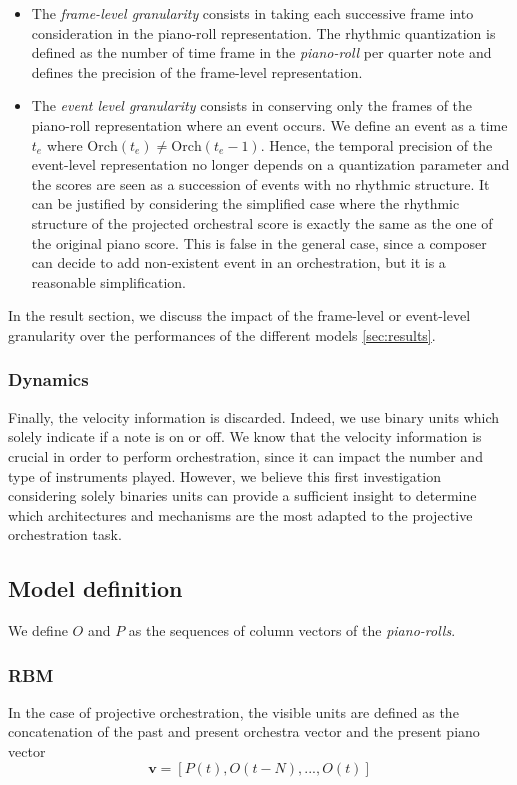 \documentclass{article}
\begin{document}
\begin{itemize}
\item The \textit{frame-level granularity} consists in taking each successive frame into consideration in the piano-roll representation. The rhythmic quantization is defined as the number of time frame in the \textit{piano-roll} per quarter note and defines the precision of the frame-level representation.
\item The \textit{event level granularity} consists in conserving only the frames of the piano-roll representation where an event occurs. We define an event as a time $t_{e}$ where $\text{Orch}(t_{e}) \neq \text{Orch}(t_{e} - 1)$.  
Hence, the temporal precision of the event-level representation no longer depends on a quantization parameter and the scores are seen as a succession of events with no rhythmic structure.
It can be justified by considering the simplified case where the rhythmic structure of the projected orchestral score is exactly the same as the one of the original piano score. 
This is false in the general case, since a composer can decide to add non-existent event in an orchestration, but it is a reasonable simplification.
\end{itemize}
In the result section, we discuss the impact of the frame-level or event-level granularity over the performances of the different models \ref{sec:results}.

\subsubsection{Dynamics}
Finally, the velocity information is discarded. Indeed, we use binary units which solely indicate if a note is on or off. We know that the velocity information is crucial in order to perform orchestration, since it can impact the number and type of instruments played. However, we believe this first investigation considering solely binaries units can provide a sufficient insight to determine which architectures and mechanisms are the most adapted to the projective orchestration task.

\subsection{Model definition}
We define $O$ and $P$ as the sequences of column vectors of the \textit{piano-rolls}.
\subsubsection{RBM}
In the case of projective orchestration, the visible units are defined as the concatenation of the past and present orchestra vector and the present piano vector
\begin{equation}
\label{eq:visible_rbm}
\bm{v} = \left[P(t),O(t-N),...,O(t)\right]
\end{equation}
\end{document}
